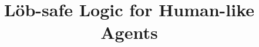 \usepackage{mathrsfs}
\usepackage{pgf}
\usepackage{multirow,array}
\usepackage{mathpartir}
\usepackage{float}
\usepackage{tikz}
\usetikzlibrary{arrows,automata,positioning,shapes.multipart}
\usepackage{stmaryrd}

\usepackage{fancyvrb}
\usepackage{alltt}
\usepackage{listings}

\newcommand{\Rel}[1]{R_{#1}}
\newcommand{\Act}[1]{[ \mathit{#1} ]}
\newcommand{\ActPos}[1]{\langle \mathit{XSTIT_{#1}} \rangle}
\newcommand{\Know}{\mathbf{K}\,} 
\newcommand{\Kns}[1]{\mathbf{K}_{\mathbf{#1}}\,} 
\newcommand{\Bel}{\mathbf{B}\,} 
\newcommand{\Bels}[1]{\mathbf{B}_{\mathbf{#1}}\,} 
\newcommand{\Pos}  {\langle \mathbf{K} \rangle\,} 
\newcommand{\Poss}[1]  {\langle \mathbf{K}_{#1} \rangle\,}
\newcommand{\BPos} {\langle \mathbf{B} \rangle\,}
\newcommand{\BPoss}[1]{\langle \mathbf{B}_{#1} \rangle\,}
\newcommand{\STIT}[1] {\mathbf{[XSTIT\ {#1}]}}
\newcommand{\Safe} {\mathbf{S}}
\newcommand{\safe} {\mathit{safe}}
\newcommand{\choice}[1]{\mathit{Choice_{#1}}}
\newcommand{\neXt}{\mathit{X}}
\newcommand{\Pal}[1]{\mathbf{[#1]}}
\newcommand{\PalPos}[1]{\mathbf{\langle#1\rangle}}
\newcommand{\SPal}[1]{\mathbf{[#1]^\mathcal{S}}}
\newcommand{\SPalPos}[1]{\mathbf{\langle#1\rangle^\mathcal{S}}}
%
\newcommand{\etal}{\textit{et.~al.}}
\newcommand{\nnot}{\textsf{\ not \ }}
\newcommand{\oor}{\textsf{\  or \ }}
\newcommand{\iiff}{{\  \Leftrightarrow \ }}
\newcommand {\aand}{ \textsf{\ and \ } }
\newcommand {\timplies} { \textsf{\ implies \ }}
\newcommand {\tland}{{\ \wedge \ }}
\newcommand {\tlor}{{\ \vee \ }}
\newcommand {\tlnot}{{\neg}}
\newcommand {\iimplies}{{\ \Rightarrow \ }}

\newenvironment{proofenum}{%
	\begin{enumerate}
		\renewcommand\labelenumi{(\arabic{section}.\arabic{enumi})}}
	{\end{enumerate}}

%


\title{L\"ob-safe Logic for Human-like Agents%
}

